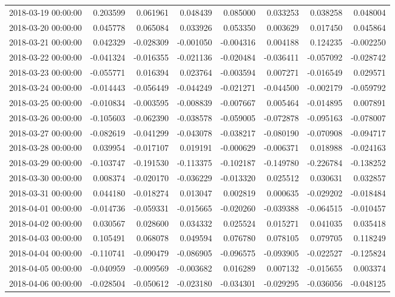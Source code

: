 \begin{tabular}{lrrrrrrr}
2018-03-19 00:00:00 & 0.203599 & 0.061961 & 0.048439 & 0.085000 & 0.033253 & 0.038258 & 0.048004 \\
2018-03-20 00:00:00 & 0.045778 & 0.065084 & 0.033926 & 0.053350 & 0.003629 & 0.017450 & 0.045864 \\
2018-03-21 00:00:00 & 0.042329 & -0.028309 & -0.001050 & -0.004316 & 0.004188 & 0.124235 & -0.002250 \\
2018-03-22 00:00:00 & -0.041324 & -0.016355 & -0.021136 & -0.020484 & -0.036411 & -0.057092 & -0.028742 \\
2018-03-23 00:00:00 & -0.055771 & 0.016394 & 0.023764 & -0.003594 & 0.007271 & -0.016549 & 0.029571 \\
2018-03-24 00:00:00 & -0.014443 & -0.056449 & -0.044249 & -0.021271 & -0.044500 & -0.002179 & -0.059792 \\
2018-03-25 00:00:00 & -0.010834 & -0.003595 & -0.008839 & -0.007667 & 0.005464 & -0.014895 & 0.007891 \\
2018-03-26 00:00:00 & -0.105603 & -0.062390 & -0.038578 & -0.059005 & -0.072878 & -0.095163 & -0.078007 \\
2018-03-27 00:00:00 & -0.082619 & -0.041299 & -0.043078 & -0.038217 & -0.080190 & -0.070908 & -0.094717 \\
2018-03-28 00:00:00 & 0.039954 & -0.017107 & 0.019191 & -0.000629 & -0.006371 & 0.018988 & -0.024163 \\
2018-03-29 00:00:00 & -0.103747 & -0.191530 & -0.113375 & -0.102187 & -0.149780 & -0.226784 & -0.138252 \\
2018-03-30 00:00:00 & 0.008374 & -0.020170 & -0.036229 & -0.013320 & 0.025512 & 0.030631 & 0.032857 \\
2018-03-31 00:00:00 & 0.044180 & -0.018274 & 0.013047 & 0.002819 & 0.000635 & -0.029202 & -0.018484 \\
2018-04-01 00:00:00 & -0.014736 & -0.059331 & -0.015665 & -0.020260 & -0.039388 & -0.064515 & -0.010457 \\
2018-04-02 00:00:00 & 0.030567 & 0.028600 & 0.034332 & 0.025524 & 0.015271 & 0.041035 & 0.035418 \\
2018-04-03 00:00:00 & 0.105491 & 0.068078 & 0.049594 & 0.076780 & 0.078105 & 0.079705 & 0.118249 \\
2018-04-04 00:00:00 & -0.110741 & -0.090479 & -0.086905 & -0.096575 & -0.093905 & -0.022527 & -0.125824 \\
2018-04-05 00:00:00 & -0.040959 & -0.009569 & -0.003682 & 0.016289 & 0.007132 & -0.015655 & 0.003374 \\
2018-04-06 00:00:00 & -0.028504 & -0.050612 & -0.023180 & -0.034301 & -0.029295 & -0.036056 & -0.048125 \\

\end{tabular}
